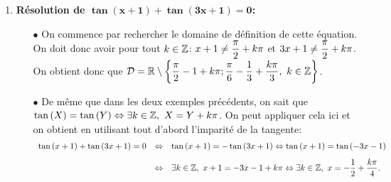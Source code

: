 \documentclass[a4paper, 11pt]{article}
\begin{document}
\begin{correction}
\begin{enumerate}
\begin{minipage}[c]{0.45\textwidth}
\begin{center}
\end{center}
\end{minipage}
\item \textbf{R\'esolution de $\mathbf{\tan{(x+1)}+\tan{(3x+1)}=0}$:}
\begin{itemize}
\item[$\bullet$] On commence par rechercher le domaine de d\'efinition de cette \'equation. On doit donc avoir pour tout $k\in\mathbb{Z}$: $x+1\not= \displaystyle\frac{\pi}{2}+k\pi$ et $3x+1\not= \displaystyle\frac{\pi}{2}+k\pi$. On obtient donc que $\mathcal{D}=\R \setminus\left\lbrace  \ddp\frac{\pi}{2}-1+k\pi;\ddp\frac{\pi}{6}-\ddp\frac{1}{3}+\ddp\frac{k\pi}{3},\ k\in\Z  \right\rbrace$. 
\item[$\bullet$] De m\^{e}me que dans les deux exemples pr\'ec\'edents, on sait que $\tan{(X)}=\tan{(Y)}\Leftrightarrow \exists k\in\Z,\ X=Y+k\pi$. On peut appliquer cela ici et on obtient en utilisant tout d'abord l'imparit\'e de la tangente:
$$\begin{array}{lll} \tan{(x+1)}+\tan{(3x+1)}=0&\Leftrightarrow &\tan{(x+1)}=-\tan{(3x+1)} \Leftrightarrow  \tan{(x+1)}=\tan{(-3x-1)} \vsec\\
&\Leftrightarrow &\exists k\in\Z,\ x+1=-3x-1+k\pi\Leftrightarrow \exists k\in\Z,\ x=-\ddp\demi+\ddp\frac{k\pi}{4}.\end{array}$$
\end{itemize}
\begin{minipage}[c]{0.45\textwidth}

\end{minipage}
\end{enumerate}
\end{correction}
\end{document}
